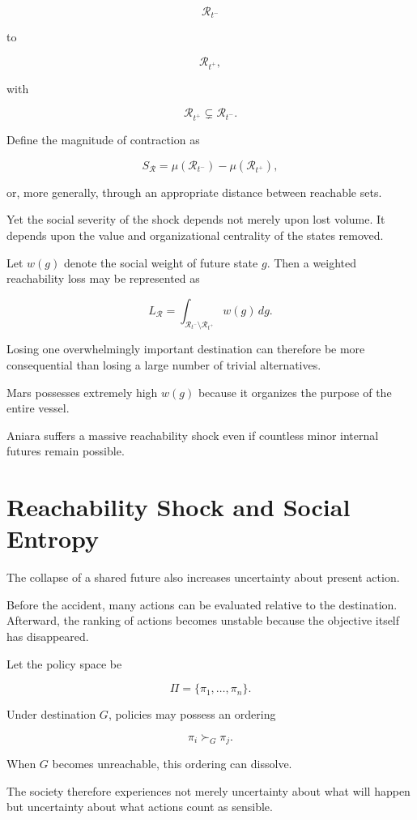 \documentclass[11pt,oneside]{book}
\theoremstyle{definition}
\theoremstyle{remark}
\newcommand{\R}{\mathcal{R}}
\begin{document}
\[
\R_{t^-}
\]

to

\[
\R_{t^+},
\]

with

\[
\R_{t^+}\subsetneq\R_{t^-}.
\]

Define the magnitude of contraction as

\[
S_{\R}
=
\mu(\R_{t^-})
-
\mu(\R_{t^+}),
\]

or, more generally, through an appropriate distance between reachable sets.

Yet the social severity of the shock depends not merely upon lost volume. It depends upon the value and organizational centrality of the states removed.

Let \(w(g)\) denote the social weight of future state \(g\). Then a weighted reachability loss may be represented as

\[
L_{\R}
=
\int_{\R_{t^-}\setminus\R_{t^+}}
w(g)\,dg.
\]

Losing one overwhelmingly important destination can therefore be more consequential than losing a large number of trivial alternatives.

Mars possesses extremely high \(w(g)\) because it organizes the purpose of the entire vessel.

Aniara suffers a massive reachability shock even if countless minor internal futures remain possible.

\section{Reachability Shock and Social Entropy}

The collapse of a shared future also increases uncertainty about present action.

Before the accident, many actions can be evaluated relative to the destination. Afterward, the ranking of actions becomes unstable because the objective itself has disappeared.

Let the policy space be

\[
\Pi
=
\{\pi_1,\ldots,\pi_n\}.
\]

Under destination \(G\), policies may possess an ordering

\[
\pi_i\succ_G\pi_j.
\]

When \(G\) becomes unreachable, this ordering can dissolve.

The society therefore experiences not merely uncertainty about what will happen but uncertainty about what actions count as sensible.
\end{document}
